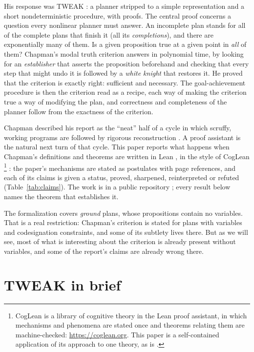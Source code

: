 \documentclass[11pt]{article}
\begin{document}
His response was TWEAK \citep{chapman1985,chapman1987}: a planner stripped
to a simple representation and a short nondeterministic procedure, with
proofs. The central proof concerns a question every nonlinear planner must
answer. An incomplete plan stands for all of the complete plans that
finish it (all its \emph{completions}), and there are exponentially many
of them. Is a given proposition true at a given point in \emph{all} of
them? Chapman's modal truth criterion answers in polynomial time, by
looking for an \emph{establisher} that asserts the proposition beforehand
and checking that every step that might undo it is followed by a
\emph{white knight} that restores it. He proved that the criterion is
exactly right: sufficient and necessary. The goal-achievement procedure is
then the criterion read as a recipe, each way of making the criterion true
a way of modifying the plan, and correctness and completeness of the
planner follow from the exactness of the criterion.

Chapman described his report as the ``neat'' half of a cycle in which
scruffy, working programs are followed by rigorous reconstruction
\citep[p.~1]{chapman1985}. A proof assistant is the natural next turn of
that cycle. This paper reports what happens when Chapman's definitions and
theorems are written in Lean \citep{demoura2021}, in the style of CogLean%
\footnote{CogLean is a library of cognitive theory in the Lean proof
assistant, in which mechanisms and phenomena are stated once and theorems
relating them are machine-checked: \url{https://coglean.org}. This paper
is a self-contained application of its approach to one theory, as is
\citep{shh88revisited}.}
\citep{coglean,cogleanintro}: the paper's mechanisms are stated as
postulates with page references, and each of its claims is given a status,
proved, sharpened, reinterpreted or refuted (Table~\ref{tab:claims}). The
work is in a public repository \citep{chapman85revisited}; every result
below names the theorem that establishes it.

The formalization covers \emph{ground} plans, whose propositions contain no
variables. That is a real restriction: Chapman's criterion is stated for
plans with variables and codesignation constraints, and some of its
subtlety lives there. But as we will see, most of what is interesting about
the criterion is already present without variables, and some of the
report's claims are already wrong there.

\section{TWEAK in brief}
\label{sec:tweak}
\end{document}
